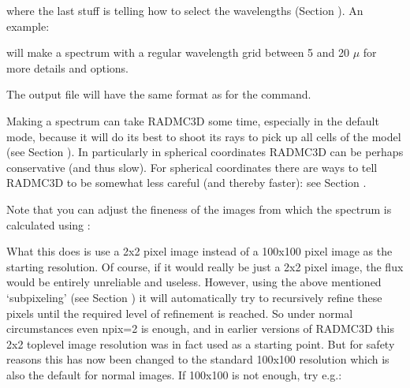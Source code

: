 \documentclass[letterpaper,10pt,english]{sphinxmanual}
\begin{document}
where the last stuff is telling  how to select the wavelengths
(Section {\hyperref[\detokenize{imagesspectra:sec-set-camera-frequencies}]{}}). An example:

\begin{sphinxVerbatim}[commandchars=\\\{\}]
          
\end{sphinxVerbatim}

will make a spectrum with a regular wavelength grid between 5 and 20
\(\mu\) for more details and options.

The output file  will have the same format as for the 
command.

Making a spectrum can take RADMC\sphinxhyphen{}3D some time, especially in the default mode,
because it will do its best to shoot its rays to pick up all cells of the model
(see Section {\hyperref[\detokenize{imagesspectra:sec-recursive-subpixeling}]{}}). In particularly in spherical
coordinates RADMC\sphinxhyphen{}3D can be perhaps  conservative (and thus slow). For
spherical coordinates there are ways to tell RADMC\sphinxhyphen{}3D to be somewhat less
careful (and thereby faster): see Section {\hyperref[\detokenize{imagesspectra:sec-rec-subpixel-spher-coord}]{}}.

Note that you can adjust the fine\sphinxhyphen{}ness of the images from which the spectrum is
calculated using :

\begin{sphinxVerbatim}[commandchars=\\\{\}]
       
\end{sphinxVerbatim}

What this does is use a 2x2 pixel image instead of a 100x100 pixel image as the
starting resolution. Of course, if it would really be just a 2x2 pixel image,
the flux would be entirely unreliable and useless. However, using the above
mentioned ‘sub\sphinxhyphen{}pixeling’ (see Section {\hyperref[\detokenize{imagesspectra:sec-recursive-subpixeling}]{}}) it will
automatically try to recursively refine these pixels until the required level of
refinement is reached. So under normal circumstances even npix=2 is enough, and
in earlier versions of RADMC\sphinxhyphen{}3D this 2x2 top\sphinxhyphen{}level image resolution was in fact
used as a starting point. But for safety reasons this has now been changed to
the standard 100x100 resolution which is also the default for normal images. If
100x100 is not enough, try e.g.:
\end{document}
